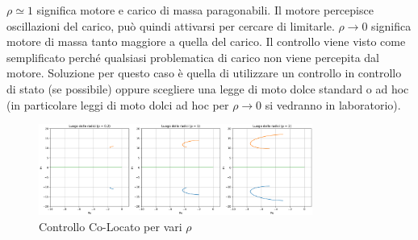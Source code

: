 \(\rho \simeq 1\) significa motore e carico di massa paragonabili. Il motore percepisce oscillazioni del carico, può quindi attivarsi per cercare di limitarle.
\(\rho \rightarrow 0\) significa motore di massa tanto maggiore a quella del carico. Il controllo viene visto come semplificato perché qualsiasi problematica di carico non viene percepita dal motore. Soluzione per questo caso è quella di utilizzare un controllo in controllo di stato (se possibile) oppure scegliere una legge di moto dolce standard o ad hoc (in particolare leggi di moto dolci ad hoc per \(\rho \rightarrow 0\) si vedranno in laboratorio).

\begin{figure}[h]
    \centering
    \includegraphics[width=0.8\textwidth]{Immagini/controllo_v_colocato_subplot_rho.png}
    \caption{Controllo Co-Locato per vari \(\rho\)}
\end{figure}




